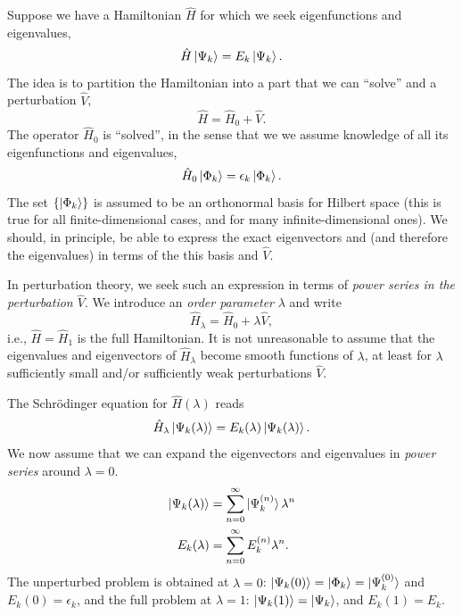 \documentclass{report}
\theoremstyle{plain}
\theoremstyle{definition}
\begin{document}
Suppose we have a Hamiltonian $\hat{H}$ for which we seek eigenfunctions and
eigenvalues,
\begin{equation}
  \hat{H} \ket{\Psi_k} = E_k \ket{\Psi_k}.
\end{equation}
The idea is to partition the Hamiltonian into a
part that we can ``solve'' and a perturbation $\hat{V}$,
\begin{equation}
  \hat{H} = \hat{H}_0 + \hat{V}.
\end{equation}
The operator $\hat{H}_0$ is ``solved'', in the sense that we we assume
knowledge of all its
eigenfunctions and eigenvalues,
\begin{equation}
  \hat{H}_0 \ket{\Phi_k} = \epsilon_k \ket{\Phi_k}. \label{eq:se-unpert}
\end{equation}
The set $\{\ket{\Phi_k}\}$ is assumed to be an orthonormal basis for
Hilbert space (this is true for all finite-dimensional cases, and for
many infinite-dimensional ones).
We should, in principle, be able to express the exact eigenvectors
and (and therefore the eigenvalues) in terms of the this basis and
$\hat{V}$.

In perturbation theory, we seek such an expression in terms of
\emph{power series in the perturbation $\hat{V}$}. We introduce an
\emph{order parameter} $\lambda$ and write
\begin{equation}
  \hat{H}_\lambda = \hat{H}_0 + \lambda \hat{V},
\end{equation}
i.e., $\hat{H} = \hat{H}_1$ is the full Hamiltonian. It is not
unreasonable to assume that the eigenvalues and eigenvectors of
$\hat{H}_\lambda$ become smooth functions of $\lambda$, at least for
$\lambda$ sufficiently small and/or sufficiently weak perturbations $\hat{V}$.

The Schr\"odinger equation for $\hat{H}(\lambda)$ reads
\begin{equation}
  \hat{H}_\lambda \ket{\Psi_k (\lambda)} = E_k(\lambda)
  \ket{\Psi_k(\lambda)}.
\end{equation}
We now assume that we can expand the
eigenvectors and eigenvalues in \emph{power series} around $\lambda =
0$.
\begin{subequations}
  \label{eq:rspt-exps}
  \begin{align}
    \ket{\Psi_k(\lambda)} &= \sum_{n=0}^\infty
    \ket{\Psi_k^{(n)}} \lambda^n \label{eq:rspt-psi} \\
    E_k(\lambda) &= \sum_{n=0}^\infty
    E_k^{(n)} \lambda^n.\label{eq:rspt-e}
  \end{align}
\end{subequations}
The unperturbed problem is obtained at $\lambda=0$: $\ket{\Psi_k(0)} =
\ket{\Phi_k} = \ket{\Psi_k^{(0)}}$ and $E_k(0) = \epsilon_k$, and the full problem at
$\lambda=1$: $\ket{\Psi_k(1)} = \ket{\Psi_k}$, and $E_k(1) = E_k$.
\end{document}
